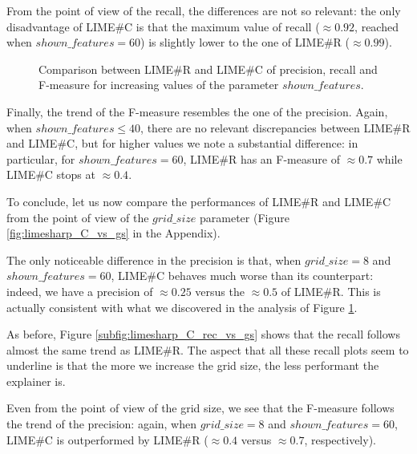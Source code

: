 \documentclass[12pt, twoside, a4paper]{report}
\begin{document}
From the point of view of the recall, the differences are not so relevant: the only disadvantage of LIME\#C is that the maximum value of recall ($\approx 0.92$, reached when $shown\_features = 60$) is slightly lower to the one of LIME\#R ($\approx 0.99$). 

\begin{figure}
\centering
{}
\caption{Comparison between LIME\#R and LIME\#C of precision, recall and F-measure for increasing values of the parameter $shown\_features$.}
\label{subfig:R-C-comparison}
\end{figure}

Finally, the trend of the F-measure resembles the one of the precision. Again, when $shown\_features \leq 40$, there are no relevant discrepancies between LIME\#R and LIME\#C, but for higher values we note a substantial difference: in particular, for $shown\_features = 60$, LIME\#R has an F-measure of $\approx 0.7$ while LIME\#C stops at $\approx 0.4$.
\bigskip

To conclude, let us now compare the performances of LIME\#R and LIME\#C from the point of view of the $grid\_size$ parameter (Figure \ref{fig:limesharp_C_vs_gs} in the Appendix). 

The only noticeable difference in the precision is that, when $grid\_size = 8$ and $shown\_features = 60$, LIME\#C behaves much worse than its counterpart: indeed, we have a precision of $\approx 0.25$ versus the $\approx 0.5$ of LIME\#R. This is actually consistent with what we discovered in the analysis of Figure \ref{subfig:R-C-comparison}.

As before, Figure \ref{subfig:limesharp_C_rec_vs_gs} shows that the recall follows almost the same trend as LIME\#R. The aspect that all these recall plots seem to underline is that the more we increase the grid size, the less performant the explainer is. 

Even from the point of view of the grid size, we see that the F-measure follows the trend of the precision: again, when $grid\_size = 8$ and $shown\_features = 60$, LIME\#C is outperformed by LIME\#R ($\approx 0.4$ versus $\approx 0.7$, respectively).
\end{document}
